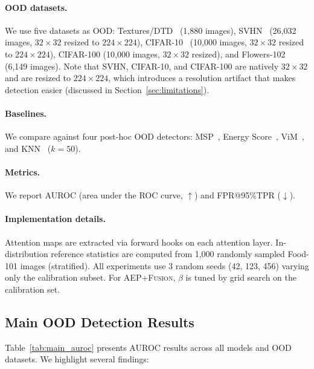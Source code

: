 \documentclass{article}
\newcommand{\AEPFusion}{\textsc{AEP+Fusion}}
\begin{document}
\paragraph{OOD datasets.} We use five datasets as OOD: Textures/DTD~\citep{cimpoi2014describing} (1,880 images), SVHN~\citep{netzer2011reading} (26,032 images, $32 \times 32$ resized to $224 \times 224$), CIFAR-10~\citep{krizhevsky2009learning} (10,000 images, $32 \times 32$ resized to $224 \times 224$), CIFAR-100 (10,000 images, $32 \times 32$ resized), and Flowers-102~\citep{nilsback2008automated} (6,149 images). Note that SVHN, CIFAR-10, and CIFAR-100 are natively $32 \times 32$ and are resized to $224 \times 224$, which introduces a resolution artifact that makes detection easier (discussed in Section~\ref{sec:limitations}).

\paragraph{Baselines.} We compare against four post-hoc OOD detectors: MSP~\citep{hendrycks2017baseline}, Energy Score~\citep{liu2020energy}, ViM~\citep{wang2022vim}, and KNN~\citep{sun2022out} ($k=50$).

\paragraph{Metrics.} We report AUROC (area under the ROC curve, $\uparrow$) and FPR@95\%TPR ($\downarrow$).

\paragraph{Implementation details.} Attention maps are extracted via forward hooks on each attention layer. In-distribution reference statistics are computed from 1,000 randomly sampled Food-101 images (stratified). All experiments use 3 random seeds (42, 123, 456) varying only the calibration subset. For \AEPFusion{}, $\beta$ is tuned by grid search on the calibration set.

\subsection{Main OOD Detection Results}

Table~\ref{tab:main_auroc} presents AUROC results across all models and OOD datasets. We highlight several findings:
\end{document}
